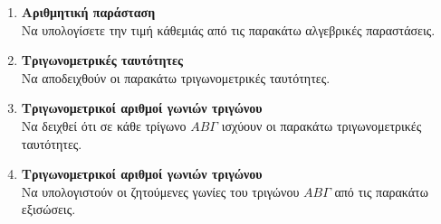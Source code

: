 \documentclass[twoside,nofonts,internet]{askhseis}
\DeclareRobustCommand{\frac}[3][0pt]{%
{\begingroup\hspace{#1}#2\hspace{#1}\endgroup\over\hspace{#1}#3\hspace{#1}}}
\newcommand{\hm}[1]{\textrm{ημ}#1}
\newcommand{\syn}[1]{\textrm{συν}#1}
\newcommand{\ef}[1]{\textrm{εφ}#1}
\newcommand{\syf}[1]{\textrm{σφ}#1}
\begin{document}
\begin{enumerate}
\begin{multicols}{4}
\begin{rlist}[leftmargin=5mm]
\item $ 210\degree $
\item $ 240\degree $
\item $ 225\degree $
\item $ 570\degree $
\item $ 600\degree $
\item $ 945\degree $
\item $ 1680\degree $
\item $ -120\degree $
\end{rlist}
\end{multicols}
\item \textbf{Αριθμητική παράσταση}\\
Να υπολογίσετε την τιμή κάθεμιάς από τις παρακάτω αλγεβρικές παραστάσεις.
\item \textbf{Τριγωνομετρικές ταυτότητες}\\
Να αποδειχθούν οι παρακάτω τριγωνομετρικές ταυτότητες.
\item \textbf{Τριγωνομετρικοί αριθμοί γωνιών τριγώνου}\\
Να δειχθεί ότι σε κάθε τρίγωνο $ AB\varGamma $ ισχύουν οι παρακάτω τριγωνομετρικές ταυτότητες.
\item \textbf{Τριγωνομετρικοί αριθμοί γωνιών τριγώνου}\\
Να υπολογιστούν οι ζητούμενες γωνίες του τριγώνου $ AB\varGamma $ από τις παρακάτω εξισώσεις.
\end{enumerate}
\end{document}
